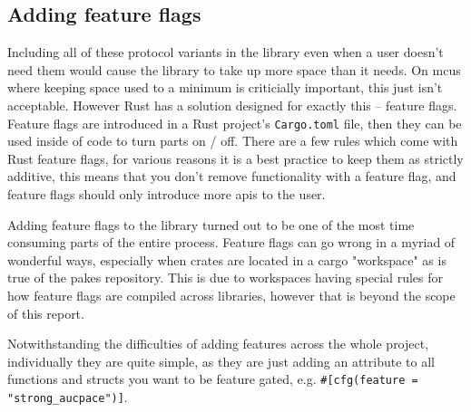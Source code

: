 \subsection{Adding feature flags}
Including all of these protocol variants in the library even when a user doesn't need them would cause the library to take up more space than it needs.
On \glspl{mcu} where keeping space used to a minimum is criticially important, this just isn't acceptable.
However Rust has a solution designed for exactly this -- feature flags.
Feature flags are introduced in a Rust project's \texttt{Cargo.toml} file, then they can be used inside of code to turn parts on / off.
There are a few rules which come with Rust feature flags, for various reasons it is a best practice to keep them as strictly additive, this means that you don't remove functionality with a feature flag, and feature flags should only introduce more \glspl{api} to the user.

Adding feature flags to the library turned out to be one of the most time consuming parts of the entire process.
Feature flags can go wrong in a myriad of wonderful ways, especially when crates are located in a cargo "workspace" as is true of the \glspl{pake} repository.
This is due to workspaces having special rules for how feature flags are compiled across libraries, however that is beyond the scope of this report.

Notwithstanding the difficulties of adding features across the whole project, individually they are quite simple, as they are just adding an attribute to all functions and structs you want to be feature gated, e.g. \verb|#[cfg(feature = "strong_aucpace")]|.

